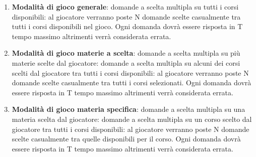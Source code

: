         \begin{enumerate}
            \item \textbf{Modalità di gioco generale}: domande a scelta multipla su tutti i corsi disponibili: al giocatore verranno poste N domande scelte casualmente tra tutti i corsi disponibili nel gioco. Ogni domanda dovrà essere risposta in T tempo massimo altrimenti verrà considerata errata.
            
            \item \textbf{Modalità di gioco materie a scelta}: domande a scelta multipla su più materie scelte dal giocatore: domande a scelta multipla su alcuni dei corsi scelti dal giocatore tra tutti i corsi disponibili: al giocatore verranno poste N domande scelte casualmente tra tutti i corsi selezionati. Ogni domanda dovrà essere risposta in T tempo massimo altrimenti verrà considerata errata.
            
            \item \textbf{Modalità di gioco materia specifica}: domande a scelta multipla su una materia scelta dal giocatore: domande a scelta multipla su un corso scelto dal giocatore tra tutti i corsi disponibili: al giocatore verranno poste N domande scelte casualmente tra quelle disponibili per il corso. Ogni domanda dovrà essere risposta in T tempo massimo altrimenti verrà considerata errata.


\end{enumerate}
